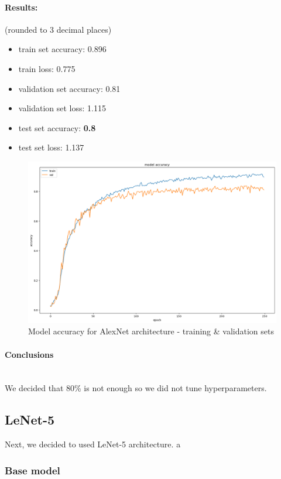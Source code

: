 \documentclass[12pt]{article}
\begin{document}
      \paragraph{Results:} (rounded to 3 decimal places)
        \begin{itemize}
          \item train set accuracy: 0.896
          \item train loss: 0.775
          \item validation set accuracy: 0.81
          \item validation set loss: 1.115
          \item test set accuracy: \textbf{0.8}
          \item test set loss: 1.137
        \end{itemize}
            \begin{figure}[H]
              \includegraphics[width=\linewidth]{images/alex-net.png}
              \caption{Model accuracy for AlexNet architecture - training \& validation sets}
              \label{fig:alex-net}
            \end{figure}
      \paragraph{Conclusions} \mbox{} \\
      We decided that 80\% is not enough so we did not tune hyperparameters.
    \subsection{LeNet-5}
      Next, we decided to used LeNet-5 architecture. a
      \subsubsection{Base model}
        \inputminted[linenos]{python}{code/lenet.py}
\end{document}
